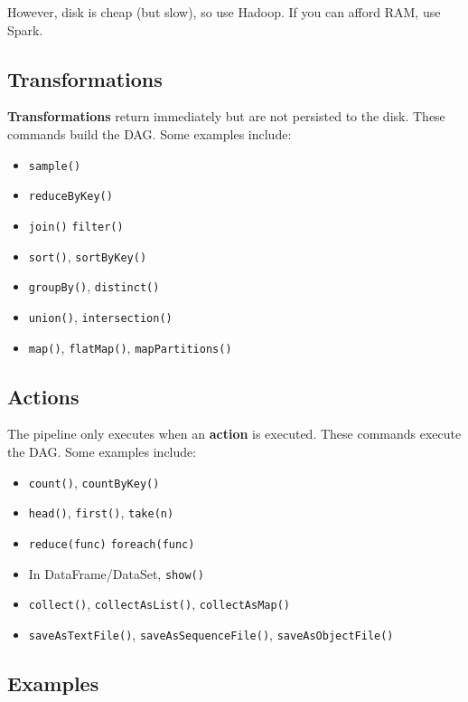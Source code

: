 \documentclass{report}
\renewcommand{\bf}[1]{\textbf{{#1}}}
\renewcommand{\tt}[1]{\texttt{{#1}}}
\begin{document}
However, disk is cheap (but slow), so use Hadoop. If you can afford RAM, use
Spark.

\subsection{Transformations}
\bf{Transformations} return immediately but are not persisted to the disk. These
commands build the DAG. Some examples include:
\begin{itemize}[label=$\to$]
    \item \tt{sample()}
    \item \tt{reduceByKey()}
    \item \tt{join()} \tt{filter()}
    \item \tt{sort()}, \tt{sortByKey()}
    \item \tt{groupBy()}, \tt{distinct()}
    \item \tt{union()}, \tt{intersection()}
    \item \tt{map()}, \tt{flatMap()}, \tt{mapPartitions()}
\end{itemize}

\subsection{Actions}
The pipeline only executes when an \bf{action} is executed. These commands
execute the DAG. Some examples include:
\begin{itemize}[label=$\to$]
    \item \tt{count()}, \tt{countByKey()}
    \item \tt{head()}, \tt{first()}, \tt{take(n)}
    \item \tt{reduce(func)} \tt{foreach(func)}
    \item In DataFrame/DataSet, \tt{show()}
    \item \tt{collect()}, \tt{collectAsList()}, \tt{collectAsMap()}
    \item \tt{saveAsTextFile()}, \tt{saveAsSequenceFile()}, \tt{saveAsObjectFile()}
\end{itemize}

\subsection{Examples}
\end{document}
